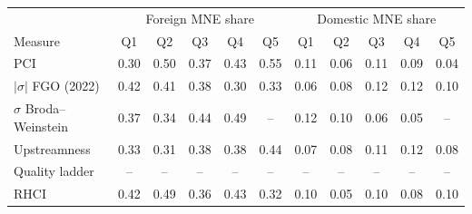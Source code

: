 \begin{tabular}{lccccc|ccccc}
\toprule
 & \multicolumn{5}{c}{Foreign MNE share} & \multicolumn{5}{c}{Domestic MNE share} \\
Measure & Q1 & Q2 & Q3 & Q4 & Q5 & Q1 & Q2 & Q3 & Q4 & Q5 \\
\midrule
PCI & 0.30 & 0.50 & 0.37 & 0.43 & 0.55 & 0.11 & 0.06 & 0.11 & 0.09 & 0.04 \\
$|\sigma|$ FGO (2022) & 0.42 & 0.41 & 0.38 & 0.30 & 0.33 & 0.06 & 0.08 & 0.12 & 0.12 & 0.10 \\
$\sigma$ Broda--Weinstein & 0.37 & 0.34 & 0.44 & 0.49 & -- & 0.12 & 0.10 & 0.06 & 0.05 & -- \\
Upstreamness & 0.33 & 0.31 & 0.38 & 0.38 & 0.44 & 0.07 & 0.08 & 0.11 & 0.12 & 0.08 \\
Quality ladder & -- & -- & -- & -- & -- & -- & -- & -- & -- & -- \\
RHCI & 0.42 & 0.49 & 0.36 & 0.43 & 0.32 & 0.10 & 0.05 & 0.10 & 0.08 & 0.10 \\
\bottomrule
\end{tabular}
